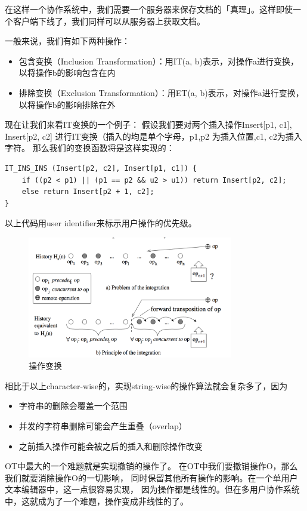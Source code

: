 \documentclass[11pt]{article}
\begin{document}
在这样一个协作系统中，我们需要一个服务器来保存文档的「真理」。这样即使一个客户端下线了，我们同样可以从服务器上获取文档。

一般来说，我们有如下两种操作：
\begin{itemize}
    \item 包含变换（Inclusion Transformation）：用IT(a, b)表示，对操作a进行变换，以将操作b的影响包含在内
    \item 排除变换（Exclusion Transformation）：用ET(a, b)表示，对操作a进行变换，以将操作b的影响排除在外
\end{itemize}

现在让我们来看IT变换的一个例子：
假设我们要对两个插入操作Insert[p1, c1], Insert[p2, c2]
进行IT变换（插入的均是单个字母，p1,p2 为插入位置,c1, c2为插入字符。
那么我们的变换函数将是这样实现的：

\begin{lstlisting}[style=CStyle]
IT_INS_INS (Insert[p2, c2], Insert[p1, c1]) {
    if ((p2 < p1) || (p1 == p2 && u2 > u1))	return Insert[p2, c2];
    else return Insert[p2 + 1, c2];
}
\end{lstlisting}
以上代码用user identifier来标示用户操作的优先级。

\begin{figure}[H]
    \begin{center}
    \includegraphics[width=0.8\textwidth]{figures/ot_transformation.png}
    \caption{操作变换}
    \end{center}
\end{figure}

相比于以上character-wise的，实现string-wise的操作算法就会复杂多了，因为
\begin{itemize}
    \item 字符串的删除会覆盖一个范围
    \item 并发的字符串删除可能会产生重叠（overlap）
    \item 之前插入操作可能会被之后的插入和删除操作改变
\end{itemize}
OT中最大的一个难题就是实现撤销的操作了。
在OT中我们要撤销操作O，那么我们就要消除操作O的一切影响，
同时保留其他所有操作的影响。在一个单用户文本编辑器中，这一点很容易实现，
因为操作都是线性的。但在多用户协作系统中，这就成为了一个难题，操作变成非线性的了。
\end{document}
